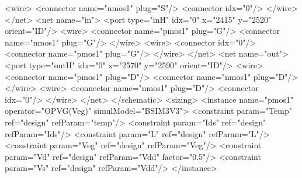 \begin{DoxyCodeInclude}
      <wire>
        <connector name=\textcolor{stringliteral}{"nmos1"} plug=\textcolor{stringliteral}{"S"}/>
        <connector idx=\textcolor{stringliteral}{"0"}/>
      </wire>
    </net>
    <net name=\textcolor{stringliteral}{"in"}>
      <port type=\textcolor{stringliteral}{"inH"} idx=\textcolor{stringliteral}{"0"} x=\textcolor{stringliteral}{"2415"} y=\textcolor{stringliteral}{"2520"} orient=\textcolor{stringliteral}{"ID"}/>
      <wire>
        <connector name=\textcolor{stringliteral}{"pmos1"} plug=\textcolor{stringliteral}{"G"}/>
        <connector name=\textcolor{stringliteral}{"nmos1"} plug=\textcolor{stringliteral}{"G"}/>
      </wire>
      <wire>
        <connector idx=\textcolor{stringliteral}{"0"}/>
        <connector name=\textcolor{stringliteral}{"pmos1"} plug=\textcolor{stringliteral}{"G"}/>
      </wire>
    </net>
    <net name=\textcolor{stringliteral}{"out"}>
      <port type=\textcolor{stringliteral}{"outH"} idx=\textcolor{stringliteral}{"0"} x=\textcolor{stringliteral}{"2570"} y=\textcolor{stringliteral}{"2590"} orient=\textcolor{stringliteral}{"ID"}/>
      <wire>
        <connector name=\textcolor{stringliteral}{"pmos1"} plug=\textcolor{stringliteral}{"D"}/>
        <connector name=\textcolor{stringliteral}{"nmos1"} plug=\textcolor{stringliteral}{"D"}/>
      </wire>
      <wire>
        <connector name=\textcolor{stringliteral}{"nmos1"} plug=\textcolor{stringliteral}{"D"}/>
        <connector idx=\textcolor{stringliteral}{"0"}/>
      </wire>
    </net>
  </schematic>
  <sizing>
    <instance name=\textcolor{stringliteral}{"pmos1"} \textcolor{keyword}{operator}=\textcolor{stringliteral}{"OPVG(Veg)"} simulModel=\textcolor{stringliteral}{"BSIM3V3"}>
      <constraint param=\textcolor{stringliteral}{"Temp"} ref=\textcolor{stringliteral}{"design"} refParam=\textcolor{stringliteral}{"temp"}/>
      <constraint param=\textcolor{stringliteral}{"Ids"}  ref=\textcolor{stringliteral}{"design"} refParam=\textcolor{stringliteral}{"Ids"}/>
      <constraint param=\textcolor{stringliteral}{"L"}    ref=\textcolor{stringliteral}{"design"} refParam=\textcolor{stringliteral}{"L"}/>
      <constraint param=\textcolor{stringliteral}{"Veg"}  ref=\textcolor{stringliteral}{"design"} refParam=\textcolor{stringliteral}{"Veg"}/>
      <constraint param=\textcolor{stringliteral}{"Vd"}   ref=\textcolor{stringliteral}{"design"} refParam=\textcolor{stringliteral}{"Vdd"} factor=\textcolor{stringliteral}{"0.5"}/>
      <constraint param=\textcolor{stringliteral}{"Vs"}   ref=\textcolor{stringliteral}{"design"} refParam=\textcolor{stringliteral}{"Vdd"}/>
    </instance>

\end{DoxyCodeInclude}
